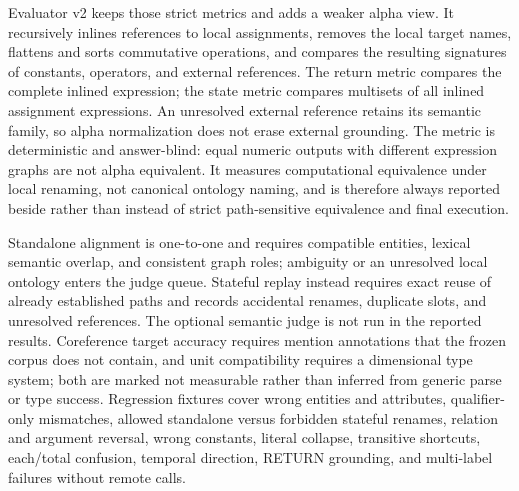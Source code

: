 \documentclass[11pt]{article}
\begin{document}
Evaluator v2 keeps those strict metrics and adds a weaker alpha view. It
recursively inlines references to local
assignments, removes the local target names, flattens and sorts commutative
operations, and compares the resulting signatures of constants, operators, and
external references. The return metric compares the complete inlined expression;
the state metric compares multisets of all inlined assignment expressions. An
unresolved external reference retains its semantic family, so alpha normalization
does not erase external grounding. The metric is deterministic and
answer-blind: equal numeric outputs with different expression graphs are not
alpha equivalent. It measures computational equivalence under local renaming,
not canonical ontology naming, and is therefore always reported beside rather
than instead of strict path-sensitive equivalence and final execution.

Standalone alignment is one-to-one and requires compatible entities, lexical
semantic overlap, and consistent graph roles; ambiguity or an unresolved local
ontology enters the judge queue. Stateful replay instead requires exact reuse of
already established paths and records accidental renames, duplicate slots, and
unresolved references. The optional semantic judge is not run in the reported
results. Coreference target accuracy requires mention annotations that the
frozen corpus does not contain, and unit compatibility requires a dimensional
type system; both are marked not measurable rather than inferred from generic
parse or type success. Regression fixtures cover wrong entities and attributes,
qualifier-only mismatches, allowed standalone versus forbidden stateful renames,
relation and argument reversal, wrong constants, literal collapse, transitive
shortcuts, each/total confusion, temporal direction, RETURN grounding, and
multi-label failures without remote calls.
\end{document}
